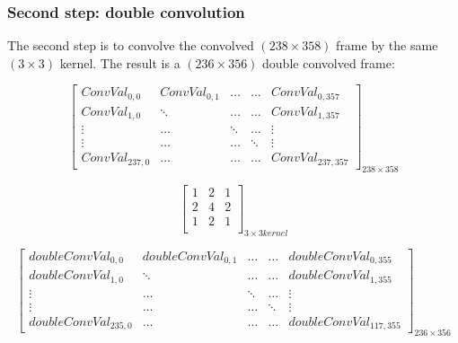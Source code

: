 \vspace{5mm}



\subsubsection{Second step: double convolution}

The second step is to convolve the convolved $(238\times 358)$ frame by the same $(3\times 3)$ kernel. The result is a $(236\times 356)$ double convolved frame:

\vspace{5mm}

\noindent\begin{minipage}{.3\textwidth}
\[
\begin{bmatrix}

ConvVal_{0,0} & ConvVal_{0,1} & \ldots & \ldots & ConvVal_{0,357}\\

ConvVal_{1,0} & \ddots & \ldots & \ldots & ConvVal_{1,357}\\

\vdots & \ldots & \ddots & \ldots & \vdots\\

\vdots & \ldots & \ldots & \ddots & \vdots\\

ConvVal_{237,0} & \ldots & \ldots  & \ldots & ConvVal_{237,357}

\end{bmatrix}_{238\times 358}
\]
\end{minipage}\hfill
\begin{minipage}{.3\textwidth}
\[
\begin{bmatrix}

1 & 2 & 1\\

2 & 4 & 2\\

1 & 2 & 1\\

\end{bmatrix}_{3\times 3 kernel}
\]
\end{minipage}

\vspace{5mm}


\[
\begin{bmatrix}

doubleConvVal_{0,0} & doubleConvVal_{0,1} & \ldots & \ldots & doubleConvVal_{0,355}\\

doubleConvVal_{1,0} & \ddots & \ldots & \ldots & doubleConvVal_{1,355}\\

\vdots & \ldots & \ddots & \ldots & \vdots\\

\vdots & \ldots & \ldots & \ddots & \vdots\\

doubleConvVal_{235,0} & \ldots & \ldots  & \ldots & doubleConvVal_{117,355}

\end{bmatrix}_{236\times 356}
\]

